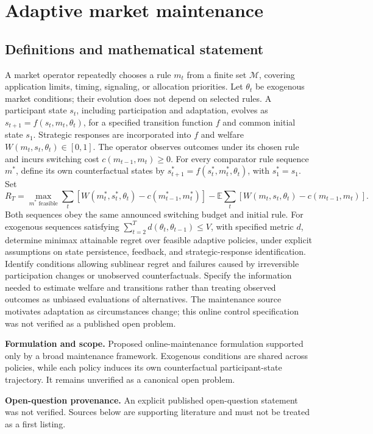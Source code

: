 \documentclass[11pt]{article}
\begin{document}
\section*{Adaptive market maintenance}\label{30007581}
\subsection{Definitions and mathematical statement}
A market operator repeatedly chooses a rule \(m_t\) from a finite set \(\mathcal M\), covering application limits, timing, signaling, or allocation priorities. Let \(\theta_t\) be exogenous market conditions; their evolution does not depend on selected rules. A participant state \(s_t\), including participation and adaptation, evolves as \(s_{t+1}=f(s_t,m_t,\theta_t)\), for a specified transition function \(f\) and common initial state \(s_1\). Strategic responses are incorporated into \(f\) and welfare \(W(m_t,s_t,\theta_t)\in[0,1]\). The operator observes outcomes under its chosen rule and incurs switching cost \(c(m_{t-1},m_t)\geq0\). For every comparator rule sequence \(m^*\), define its own counterfactual states by \(s^*_{t+1}=f(s^*_t,m^*_t,\theta_t)\), with \(s^*_1=s_1\). Set
\[
 R_T=\max_{m^*\text{ feasible}}\sum_t[W(m^*_t,s^*_t,\theta_t)-c(m^*_{t-1},m^*_t)]
 -\mathbb E\sum_t[W(m_t,s_t,\theta_t)-c(m_{t-1},m_t)].
\]
Both sequences obey the same announced switching budget and initial rule. For exogenous sequences satisfying \(\sum_{t=2}^T d(\theta_t,\theta_{t-1})\leq V\), with specified metric \(d\), determine minimax attainable regret over feasible adaptive policies, under explicit assumptions on state persistence, feedback, and strategic-response identification. Identify conditions allowing sublinear regret and failures caused by irreversible participation changes or unobserved counterfactuals. Specify the information needed to estimate welfare and transitions rather than treating observed outcomes as unbiased evaluations of alternatives. The maintenance source motivates adaptation as circumstances change; this online control specification was not verified as a published open problem.

\par\textbf{Formulation and scope.} Proposed online-maintenance formulation supported only by a broad maintenance framework. Exogenous conditions are shared across policies, while each policy induces its own counterfactual participant-state trajectory. It remains unverified as a canonical open problem.

\par\textbf{Open-question provenance.} An explicit published open-question statement was not verified. Sources below are supporting literature and must not be treated as a first listing.
\end{document}
